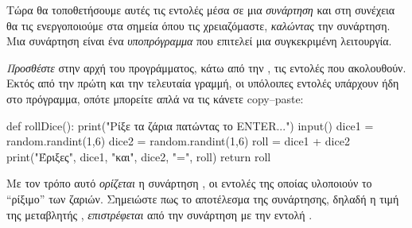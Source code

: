 \documentclass[a4paper,11pt,oneside]{book}
\begin{document}
\begin{step}
Τώρα θα τοποθετήσουμε αυτές τις εντολές μέσα σε μια \emph{συνάρτηση} και στη συνέχεια θα τις ενεργοποιούμε στα σημεία όπου τις χρειαζόμαστε, \emph{καλώντας} την συνάρτηση. Μια συνάρτηση είναι ένα \emph{υποπρόγραμμα} που επιτελεί μια συγκεκριμένη λειτουργία. 

\emph{Προσθέστε} στην αρχή του προγράμματος, κάτω από την , τις εντολές που ακολουθούν. Εκτός από την πρώτη και την τελευταία γραμμή, οι υπόλοιπες εντολές υπάρχουν ήδη στο πρόγραμμα, οπότε μπορείτε απλά να τις κάνετε copy--paste:

\clearpage
{}

\begin{pynew}
def rollDice():
    print("Ρίξε τα ζάρια πατώντας το ENTER...")
    input()
    dice1 = random.randint(1,6)
    dice2 = random.randint(1,6)
    roll = dice1 + dice2
    print("Έριξες", dice1, "και", dice2, "=", roll)
    return roll
\end{pynew}

Με τον τρόπο αυτό \emph{ορίζεται} η συνάρτηση , οι εντολές της οποίας υλοποιούν το ``ρίξιμο'' των ζαριών.
Σημειώστε πως το αποτέλεσμα της συνάρτησης, δηλαδή η τιμή της μεταβλητής , \emph{επιστρέφεται} από την συνάρτηση με την εντολή .
\end{step}
\end{document}
